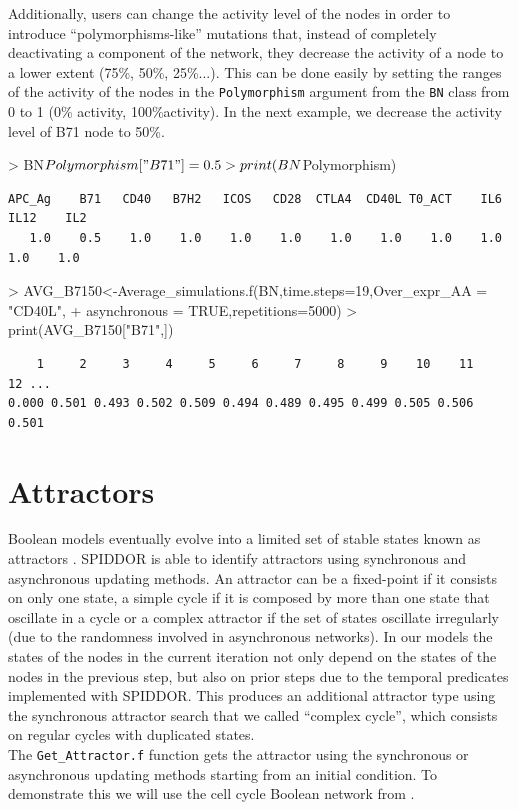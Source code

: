 \documentclass[a4paper]{article}
\begin{document}
Additionally, users can change the activity level of the nodes in order to introduce ``polymorphisms-like'' mutations that, instead of completely deactivating a component of the network, they decrease the activity of a node to a lower extent (75\%, 50\%, 25\%...). This can be done easily by setting the ranges of the activity of the nodes in the \texttt{Polymorphism} argument from the \texttt{BN} class from 0 to 1 (0\% activity, 100\%activity). In the next example, we decrease the activity level of B71 node to 50\%.
\begin{Schunk}
\begin{Sinput}
> BN$Polymorphism["B71"]=0.5
> print(BN$Polymorphism)
\end{Sinput}
\end{Schunk}
\begin{verbatim}
APC_Ag    B71   CD40   B7H2   ICOS   CD28  CTLA4  CD40L T0_ACT    IL6   IL12    IL2 
   1.0    0.5    1.0    1.0    1.0    1.0    1.0    1.0    1.0    1.0    1.0    1.0 
\end{verbatim}
\begin{Schunk}
\begin{Sinput}
> AVG_B7150<-Average_simulations.f(BN,time.steps=19,Over_expr_AA = "CD40L",
+                                    asynchronous = TRUE,repetitions=5000)
> print(AVG_B7150["B71",])
\end{Sinput}
\end{Schunk}
\begin{verbatim}
    1     2     3     4     5     6     7     8     9    10    11    12 ...
0.000 0.501 0.493 0.502 0.509 0.494 0.489 0.495 0.499 0.505 0.506 0.501
\end{verbatim}

\section{Attractors}
Boolean models eventually evolve into a limited set of stable states known as attractors \cite{Hopfensitz2012-pv}. SPIDDOR is able to identify attractors using synchronous and asynchronous updating methods. An attractor can be a fixed-point if it consists on only one state, a simple cycle if it is composed by more than one state that oscillate in a cycle or a complex attractor if the set of states oscillate irregularly (due to the randomness involved in asynchronous networks). In our models the states of the nodes in the current iteration not only depend on the states of the nodes in the previous step, but also on prior steps due to the temporal predicates implemented with SPIDDOR. This produces an additional attractor type using the synchronous attractor search that we called ``complex cycle'', which consists on regular cycles with duplicated states.
\\
The \texttt{Get\_Attractor.f} function gets the attractor using the synchronous or asynchronous updating methods starting from an initial condition. To demonstrate this we will use the cell cycle Boolean network from \cite{Faure2006-ha}.
\end{document}
